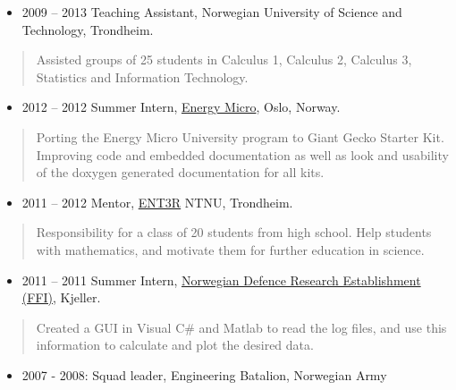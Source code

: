 \documentclass[11pt, a4paper]{article}
\providecommand{\tightlist}{%
  \setlength{\itemsep}{0pt}\setlength{\parskip}{0pt}}
\begin{document}
\begin{raggedright}
\begin{itemize}
\tightlist
\item
  2009 -- 2013 Teaching Assistant, Norwegian University of Science and
  Technology, Trondheim.
\end{itemize}

\begin{quote}
Assisted groups of 25 students in Calculus 1, Calculus 2, Calculus 3,
Statistics and Information Technology.
\end{quote}

\begin{itemize}
\tightlist
\item
  2012 -- 2012 Summer Intern, \href{https://www.silabs.com}{Energy
  Micro}, Oslo, Norway.
\end{itemize}

\begin{quote}
Porting the Energy Micro University program to Giant Gecko Starter Kit.
Improving code and embedded documentation as well as look and usability
of the doxygen generated documentation for all kits.
\end{quote}

\begin{itemize}
\tightlist
\item
  2011 -- 2012 Mentor, \href{https://www.ent3r.no}{ENT3R} NTNU,
  Trondheim.
\end{itemize}

\begin{quote}
Responsibility for a class of 20 students from high school. Help
students with mathematics, and motivate them for further education in
science.
\end{quote}

\begin{itemize}
\tightlist
\item
  2011 -- 2011 Summer Intern, \href{https://www.ffi.no}{Norwegian
  Defence Research Establishment (FFI)}, Kjeller.
\end{itemize}

\begin{quote}
Created a GUI in Visual C\# and Matlab to read the log files, and use
this information to calculate and plot the desired data.
\end{quote}

\begin{itemize}
\tightlist
\item
  2007 - 2008: Squad leader, Engineering Batalion, Norwegian Army
\end{itemize}


\end{raggedright}
\end{document}
